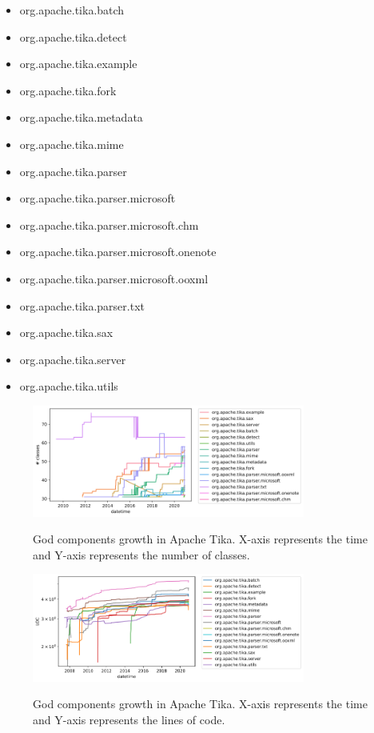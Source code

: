 \documentclass{article}
\begin{document}
\begin{minipage}[t]{.4\textwidth}
    \begin{itemize}
        \item org.apache.tika.batch
        \item org.apache.tika.detect
        \item org.apache.tika.example
        \item org.apache.tika.fork
        \item org.apache.tika.metadata
        \item org.apache.tika.mime
        \item org.apache.tika.parser
        \item org.apache.tika.parser.microsoft
    \end{itemize}   
\end{minipage}%
\begin{minipage}[t]{.4\textwidth}
        \begin{itemize}
        \item org.apache.tika.parser.microsoft.chm
        \item org.apache.tika.parser.microsoft.onenote
        \item org.apache.tika.parser.microsoft.ooxml
        \item org.apache.tika.parser.txt
        \item org.apache.tika.sax
        \item org.apache.tika.server
        \item org.apache.tika.utils
    \end{itemize}
\end{minipage}%
 \begin{figure}[ht]
    \centering
    \includegraphics[width=0.8\textwidth]{report/images/gcs-package-classes-growth.png}
    \label{fig:class_growth}
    \caption{God components growth in Apache Tika. X-axis represents the time and Y-axis represents the number of classes.}
\end{figure}
\begin{figure}[ht]
    \centering
    \includegraphics[width=0.8\textwidth]{report/images/gcs-package-loc-growth.png}
    \label{fig:loc_growth}
    \caption{God components growth in Apache Tika. X-axis represents the time and Y-axis represents the lines of code.}
\end{figure}
\end{document}
